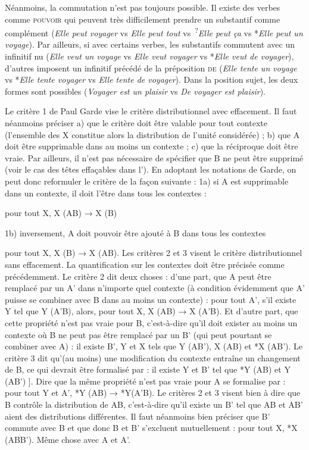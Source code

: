 {    Néanmoins, la commutation n’est pas toujours possible. Il existe des verbes comme \textsc{pouvoir} qui peuvent très difficilement prendre un substantif comme complément (\textit{Elle peut voyager} vs \textit{Elle peut tout} vs~\textsuperscript{?}\textit{Elle peut ça} vs *\textit{Elle peut un voyage}). Par ailleurs, si avec certains verbes, les substantifs commutent avec un infinitif nu (\textit{Elle veut un voyage} vs \textit{Elle veut voyager} vs *\textit{Elle veut de voyager}), d’autres imposent un infinitif précédé de la préposition \textsc{de} (\textit{Elle tente un voyage} vs *\textit{Elle tente voyager} vs \textit{Elle tente de voyager}). Dans la position sujet, les deux formes sont possibles (\textit{Voyager est un plaisir} vs \textit{De voyager est plaisir}).

     Le critère 1 de Paul Garde vise le critère distributionnel avec effacement. Il faut néanmoins préciser a) que le critère doit être valable pour tout contexte (l’ensemble des X constitue alors la distribution de l’unité considérée) ; b) que A doit être supprimable dans au moins un contexte ; c) que la réciproque doit être vraie. Par ailleurs, il n’est pas nécessaire de spécifier que B ne peut être supprimé (voir le cas des têtes effaçables dans l’). En adoptant les notations de Garde, on peut donc reformuler le critère de la façon suivante :
    \ea
    1a) si A est supprimable dans un contexte, il doit l’être dans tous les contextes :

        pour tout X, X (AB) → X (B)

    1b) inversement, A doit pouvoir être ajouté à B dans tous les contextes

        pour tout X, X (B) → X (AB).
    \z
    Les critères 2 et 3 visent le critère distributionnel sans effacement. La quantification sur les contextes doit être précisée comme précédemment. Le critère 2 dit deux choses : d’une part, que A peut être remplacé par un A’ dans n’importe quel contexte (à condition évidemment que A’ puisse se combiner avec B dans au moins un contexte) :
    \ea
    pour tout A’, s’il existe Y tel que Y (A’B), alors, pour tout X, X (AB) → X (A’B).
    \z
    Et d’autre part, que cette propriété n’est pas vraie pour B, c’est-à-dire qu’il doit exister au moins un contexte où B ne peut pas être remplacé par un B’ (qui peut pourtant se combiner avec A) :
    \ea
    il existe B’, Y et X tels que Y (AB’), X (AB) et *X (AB’).
    \z
    Le critère 3 dit qu’(au moins) une modification du contexte entraîne un changement de B, ce qui devrait être formalisé par :
    \ea
    il existe Y et B’ tel que *Y (AB) et Y (AB’) ].
    \z
    Dire que la même propriété n’est pas vraie pour A se formalise par :
    \ea
    pour tout Y et A’, *Y (AB) → *Y(A’B).
    \z
    Le critères 2 et 3 visent bien à dire que B contrôle la distribution de AB, c’est-à-dire qu’il existe un B’ tel que AB et AB’ aient des distributions différentes. Il faut néanmoins bien préciser que B’ commute avec B et que donc B et B’ s’excluent mutuellement :
    \ea
    pour tout X, *X (ABB’).
    \z
    Même chose avec A et A’.

}
